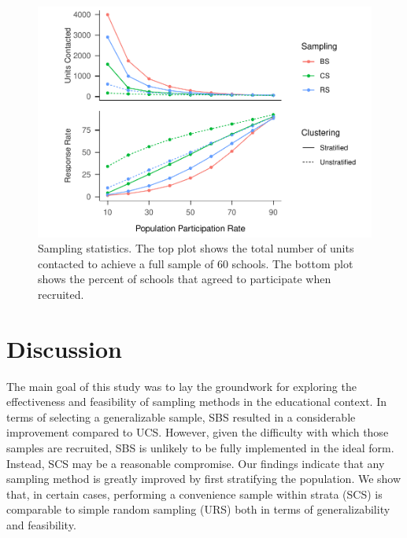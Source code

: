 \documentclass[man,floatsintext]{apa6}
\begin{document}
\begin{figure}
\centering
\includegraphics{GenSamp-Paper_files/figure-latex/fig-responses-1.pdf}
\caption{\label{fig:fig-responses}Sampling statistics. The top plot shows the total number of units contacted to achieve a full sample of 60 schools. The bottom plot shows the percent of schools that agreed to participate when recruited.}
\end{figure}





\newpage

\hypertarget{discussion}{%
\section{Discussion}\label{discussion}}

The main goal of this study was to lay the groundwork for exploring the effectiveness and feasibility of sampling methods in the educational context. In terms of selecting a generalizable sample, SBS resulted in a considerable improvement compared to UCS. However, given the difficulty with which those samples are recruited, SBS is unlikely to be fully implemented in the ideal form. Instead, SCS may be a reasonable compromise. Our findings indicate that any sampling method is greatly improved by first stratifying the population. We show that, in certain cases, performing a convenience sample within strata (SCS) is comparable to simple random sampling (URS) both in terms of generalizability and feasibility.
\end{document}
